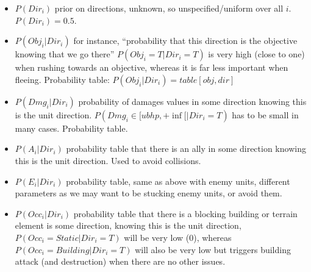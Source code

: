 \begin{itemize}
\item $P(Dir_i)$ prior on directions, unknown, so unspecified/uniform over all $i$. $P(Dir_i) = 0.5$.
\item $P(Obj_i | Dir_i)$ for instance, ``probability that this direction is the objective knowing that we go there'' $P(Obj_i = T | Dir_i = T)$ is very high (close to one) when rushing towards an objective, whereas it is far less important when fleeing. Probability table: $P(Obj_i | Dir_i) = table[obj, dir]$
\item $P(Dmg_i | Dir_i)$ probability of damages values in some direction knowing this is the unit direction. $P(Dmg_i \in [ubhp, +\inf[ | Dir_i = T)$ has to be small in many cases. Probability table.
\item $P(A_i | Dir_i)$ probability table that there is an ally in some direction knowing this is the unit direction. Used to avoid collisions.
\item $P(E_i | Dir_i)$ probability table, same as above with enemy units, different parameters as we may want to be stucking enemy units, or avoid them.
\item $P(Occ_i | Dir_i)$ probability table that there is a blocking building or terrain element is some direction, knowing this is the unit direction, $P(Occ_i = Static | Dir_i = T)$ will be very low (0), whereas $P(Occ_i = Building | Dir_i = T)$ will also be very low but triggers building attack (and destruction) when there are no other issues.
\end{itemize}

